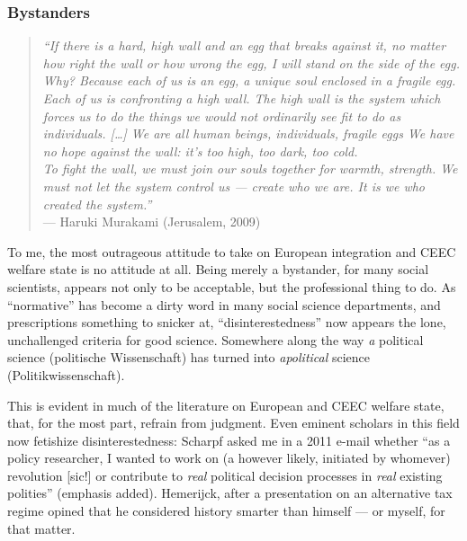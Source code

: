 \documentclass[11pt,a4paper,oneside]{article}
\begin{document}
\subsubsection{Bystanders}

\begin{quote}
	\emph{``If there is a hard, high wall and an egg that breaks against it, no matter how right the wall or how wrong the egg, I will stand on the side of the egg. \\
	Why?
	Because each of us is an egg, a unique soul enclosed in a fragile egg.
	Each of us is confronting a high wall.
	The high wall is the system which forces us to do the things we would not ordinarily see fit to do as individuals.
	[\ldots]
	We are all human beings, individuals, fragile eggs
	We have no hope against the wall:
	it's too high, too dark, too cold. \\
	To fight the wall, we must join our souls together for warmth, strength.
	We must not let the system control us --- create who we are. It is we who created the system.''}\\
	--- Haruki Murakami (Jerusalem, 2009)
\end{quote}

To me, the most outrageous attitude to take on European integration and \gls{CEEC} welfare state is no attitude at all.
Being merely a bystander, for many social scientists, appears not only to be acceptable, but the professional thing to do.
As ``normative'' has become a dirty word in many social science departments, and prescriptions something to snicker at, ``disinterestedness'' now appears the lone, unchallenged criteria for good science.
Somewhere along the way \emph{a} political science (politische Wissenschaft) has turned into \emph{apolitical} science (Politikwissenschaft).

This is evident in much of the literature on European and \gls{CEEC} welfare state, that, for the most part, refrain from judgment.
Even eminent scholars in this field now fetishize disinterestedness:
Scharpf asked me in a 2011 e-mail whether ``as a policy researcher, I wanted to work on (a however likely, initiated by whomever) revolution [sic!] or contribute to \emph{real} political decision processes in \emph{real} existing polities'' (emphasis added).
Hemerijck, after a presentation on an alternative tax regime opined that he considered history smarter than himself --- or myself, for that matter.
\end{document}
